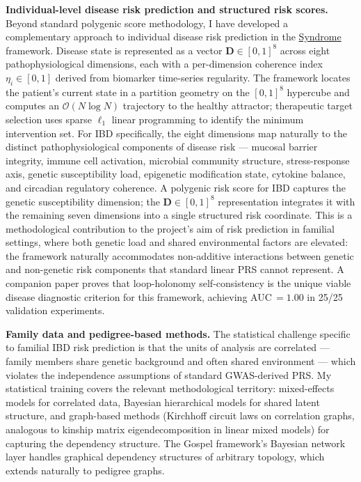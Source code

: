 \documentclass[12pt,a4paper]{article}
\begin{document}
\textbf{Individual-level disease risk prediction and structured risk scores.}
Beyond standard polygenic score methodology, I have developed a complementary
approach to individual disease risk prediction in the
\href{https://github.com/fullscreen-triangle/syndrome}{Syndrome} framework.
Disease state is represented as a vector $\mathbf{D}\in[0,1]^8$ across eight
pathophysiological dimensions, each with a per-dimension coherence index
$\eta_i\in[0,1]$ derived from biomarker time-series regularity.
The framework locates the patient's current state in a partition geometry on
the $[0,1]^8$ hypercube and computes an $\mathcal{O}(N\log N)$ trajectory
to the healthy attractor; therapeutic target selection uses sparse $\ell_1$
linear programming to identify the minimum intervention set.
For IBD specifically, the eight dimensions map naturally to the distinct
pathophysiological components of disease risk --- mucosal barrier integrity,
immune cell activation, microbial community structure, stress-response axis,
genetic susceptibility load, epigenetic modification state, cytokine balance,
and circadian regulatory coherence.
A polygenic risk score for IBD captures the genetic susceptibility dimension;
the $\mathbf{D}\in[0,1]^8$ representation integrates it with the remaining
seven dimensions into a single structured risk coordinate.
This is a methodological contribution to the project's aim of risk prediction
in familial settings, where both genetic load and shared environmental factors
are elevated: the framework naturally accommodates non-additive interactions
between genetic and non-genetic risk components that standard linear PRS cannot
represent.
A companion paper proves that loop-holonomy self-consistency is the unique
viable disease diagnostic criterion for this framework, achieving AUC$\,=1.00$
in 25/25 validation experiments.

\textbf{Family data and pedigree-based methods.}
The statistical challenge specific to familial IBD risk prediction is that the
units of analysis are correlated --- family members share genetic background and
often shared environment --- which violates the independence assumptions of
standard GWAS-derived PRS.
My statistical training covers the relevant methodological territory:
mixed-effects models for correlated data, Bayesian hierarchical models for
shared latent structure, and graph-based methods (Kirchhoff circuit laws on
correlation graphs, analogous to kinship matrix eigendecomposition in
linear mixed models) for capturing the dependency structure.
The Gospel framework's Bayesian network layer handles graphical dependency
structures of arbitrary topology, which extends naturally to pedigree graphs.
\end{document}
